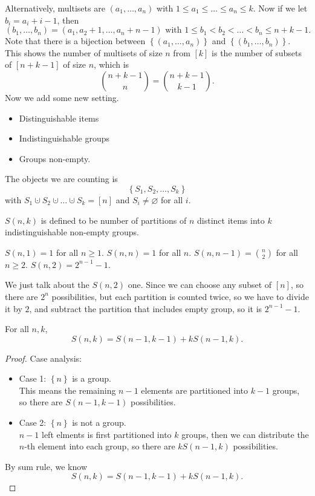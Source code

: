 Alternatively, multisets are \((a_1, \dots , a_n)\) with \(1 \le a_1 \le \dots \le a_n \le k\). Now if we let \(b_i = a_i + i - 1\), then 
\[
    (b_1, \dots , b_n) = (a_1, a_2 + 1, \dots , a_n + n - 1) \text{ with } 1 \le b_1 < b_2 < \dots < b_n \le n + k - 1.
\]   Note that there is a bijection between \(\left\{ (a_1, \dots , a_n) \right\} \) and \(\left\{ (b_1, \dots , b_n) \right\} \). This shows the number of multisets of size \(n\) from \([k]\) is the number of subsets of \([n + k - 1]\) of size \(n\), which is 
\[
    \binom{n + k - 1}{n} = \binom{n + k - 1}{k - 1}.
\]      
Now we add some new setting. 
\begin{itemize}
    \item Distinguishable items 
    \item Indistinguishable groups 
    \item Groups non-empty.
\end{itemize}
The objects we are counting is 
\[
    \left\{ S_1, S_2, \dots , S_k \right\} 
\] with \(S_1 \cupdot S_2 \cupdot \dots \cupdot S_k = [n]\) and \(S_i \neq \varnothing \) for all \(i\). 

\begin{definition} \label{def: stirling num second kind}
\(S(n,k)\) is defined to be number of partitions of \(n\) distinct items into \(k\) indistinguishable non-empty groups.
\end{definition}

\begin{eg}
    \(S(n, 1) = 1\) for all \(n \ge 1\). \(S(n, n) = 1\) for all \(n\). \(S(n, n-1) = \binom{n}{2}\) for all \(n \ge 2\). \(S(n, 2) = 2^{n-1} - 1\).       
\end{eg}
\begin{explanation}
    We just talk about the \(S(n, 2)\) one. Since we can choose any subset of \([n]\), so there are \(2^n\) possibilities, but each partition is counted twice, so we have to divide it by \(2\), and subtract the partition that includes empty group, so it is \(2^{n-1} - 1\).    
\end{explanation}

\begin{proposition}
    For all \(n, k\), 
    \[
        S(n, k) = S(n-1, k-1) + k S(n-1,k).
    \]  
\end{proposition}
\begin{proof}
    Case analysis: 
    \begin{itemize}
        \item Case 1: \(\left\{ n \right\} \) is a group. \\
        This means the remaining \(n-1\) elements are partitioned into \(k-1\) groups, so there are \(S(n-1, k-1)\) possibilities. 
        \item Case 2: \(\left\{ n \right\} \) is not a group.  \\
        \(n - 1\) left elments is first partitioned into \(k\) groups, then we can distribute the \(n\)-th element into each group, so there are \(k S(n-1, k)\) possibilities.    
    \end{itemize}
    By sum rule, we know 
    \[
        S(n, k) = S(n - 1, k - 1) + k S(n - 1, k).
    \]
\end{proof}

